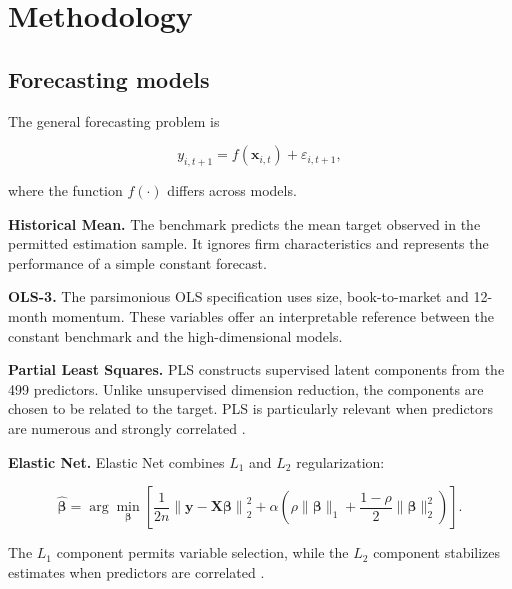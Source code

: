 \documentclass[11pt,a4paper]{article}
\begin{document}

\section{Methodology}
\label{sec:methodology}

\subsection{Forecasting models}

The general forecasting problem is

\begin{equation}
 y_{i,t+1}
 =
 f(\mathbf{x}_{i,t})
 +
 \varepsilon_{i,t+1},
 \label{eq:forecast}
\end{equation}

where the function \(f(\cdot)\) differs across models.

\textbf{Historical Mean.}
The benchmark predicts the mean target observed in the permitted estimation
sample. It ignores firm characteristics and represents the performance of a
simple constant forecast.

\textbf{OLS-3.}
The parsimonious OLS specification uses size, book-to-market and 12-month
momentum. These variables offer an interpretable reference between the
constant benchmark and the high-dimensional models.

\textbf{Partial Least Squares.}
PLS constructs supervised latent components from the 499 predictors. Unlike
unsupervised dimension reduction, the components are chosen to be related to
the target. PLS is particularly relevant when predictors are numerous and
strongly correlated \parencite{wold1984collinearity}.

\textbf{Elastic Net.}
Elastic Net combines \(L_1\) and \(L_2\) regularization:

\begin{equation}
 \widehat{\boldsymbol{\beta}}
 =
 \arg\min_{\boldsymbol{\beta}}
 \left[
 \frac{1}{2n}
 \left\|
 \mathbf{y}-\mathbf{X}\boldsymbol{\beta}
 \right\|_2^2
 +
 \alpha
 \left(
 \rho\|\boldsymbol{\beta}\|_1
 +
 \frac{1-\rho}{2}
 \|\boldsymbol{\beta}\|_2^2
 \right)
 \right].
 \label{eq:elastic-net}
\end{equation}

The \(L_1\) component permits variable selection, while the \(L_2\) component
stabilizes estimates when predictors are correlated
\parencite{tibshirani1996regression,zou2005regularization}.
\end{document}

